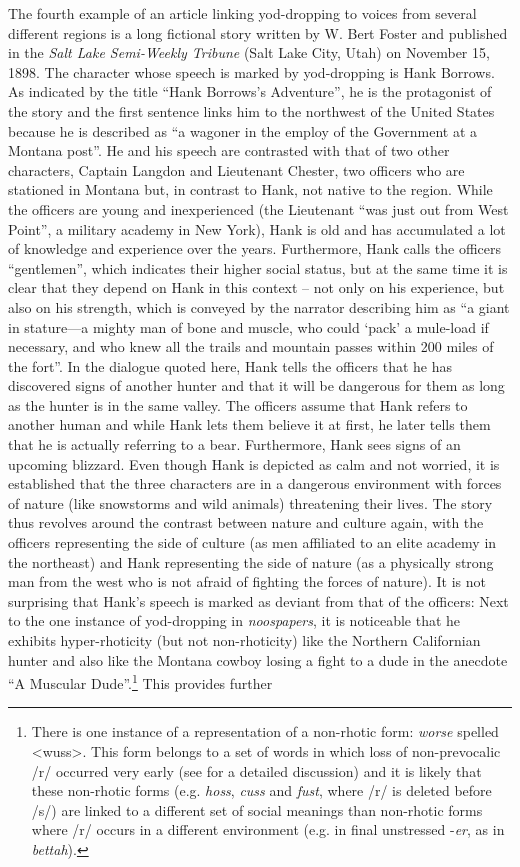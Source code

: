 The fourth example of an article linking yod-dropping to voices from several different regions is a long fictional story written by W. Bert Foster and published in the\emph{ Salt Lake Semi-Weekly Tribune} (Salt Lake City, Utah) on November 15, 1898. The character whose speech is marked by yod-dropping is Hank Borrows. As indicated by the title “Hank Borrows’s Adventure”, he is the protagonist of the story and the first sentence links him to the northwest of the United States because he is described as “a wagoner in the employ of the Government at a Montana post”. He and his speech are contrasted with that of two other characters, Captain Langdon and Lieutenant Chester, two officers who are stationed in Montana but, in contrast to Hank, not native to the region. While the officers are young and inexperienced (the Lieutenant “was just out from West Point”, a military academy in New York), Hank is old and has accumulated a lot of knowledge and experience over the years. Furthermore, Hank calls the officers “gentlemen”, which indicates their higher social status, but at the same time it is clear that they depend on Hank in this context – not only on his experience, but also on his strength, which is conveyed by the narrator describing him as “a giant in stature—a mighty man of bone and muscle, who could ‘pack’ a mule-load if necessary, and who knew all the trails and mountain passes within 200 miles of the fort”. In the dialogue quoted here, Hank tells the officers that he has discovered signs of another hunter and that it will be dangerous for them as long as the hunter is in the same valley. The officers assume that Hank refers to another human and while Hank lets them believe it at first, he later tells them that he is actually referring to a bear. Furthermore, Hank sees signs of an upcoming blizzard. Even though Hank is depicted as calm and not worried, it is established that the three characters are in a dangerous environment with forces of nature (like snowstorms and wild animals) threatening their lives. The story thus revolves around the contrast between nature and culture again, with the officers representing the side of culture (as men affiliated to an elite academy in the northeast) and Hank representing the side of nature (as a physically strong man from the west who is not afraid of fighting the forces of nature). It is not surprising that Hank’s speech is marked as deviant from that of the officers: Next to the one instance of yod-dropping in \emph{noospapers}, it is noticeable that he exhibits hyper-rhoticity (but not non-rhoticity) like the Northern Californian hunter and also like the Montana cowboy losing a fight to a dude in the anecdote “A Muscular Dude”.\footnote{There is one instance of a representation of a non-rhotic form: \emph{worse} spelled <wuss>. This form belongs to a set of words in which loss of non-prevocalic /r/ occurred very early (see  for a detailed discussion) and it is likely that these non-rhotic forms (e.g. \emph{hoss}, \emph{cuss} and \emph{fust}, where /r/ is deleted before /s/) are linked to a different set of social meanings than non-rhotic forms where /r/ occurs in a different environment (e.g. in final unstressed -\emph{er}, as in \emph{bettah}).} This provides further 